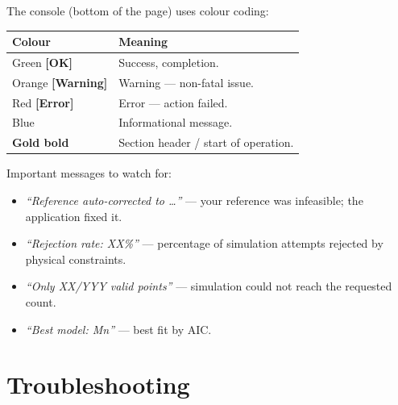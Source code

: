 \documentclass[11pt,a4paper]{article}
\begin{document}
The console (bottom of the page) uses colour coding:

\begin{center}
\begin{tabular}{ll}
\toprule
\textbf{Colour} & \textbf{Meaning} \\
\midrule
\textcolor{greenhl}{Green \textbf{[OK]}} & Success, completion. \\
\textcolor{warnhl}{Orange \textbf{[Warning]}} & Warning --- non-fatal issue. \\
\textcolor{redhl}{Red \textbf{[Error]}} & Error --- action failed. \\
\textcolor{bluehl}{Blue} & Informational message. \\
\textcolor{accent}{\textbf{Gold bold}} & Section header / start of operation. \\
\bottomrule
\end{tabular}
\end{center}

Important messages to watch for:

\begin{itemize}[leftmargin=1.4em]
  \item \textit{``Reference auto-corrected to \ldots''} --- your reference was infeasible; the application fixed it.
  \item \textit{``Rejection rate: XX\%''} --- percentage of simulation attempts rejected by physical constraints.
  \item \textit{``Only XX/YYY valid points''} --- simulation could not reach the requested count.
  \item \textit{``Best model: M\textit{n}''} --- best fit by AIC.
\end{itemize}

\section{Troubleshooting}
\end{document}

